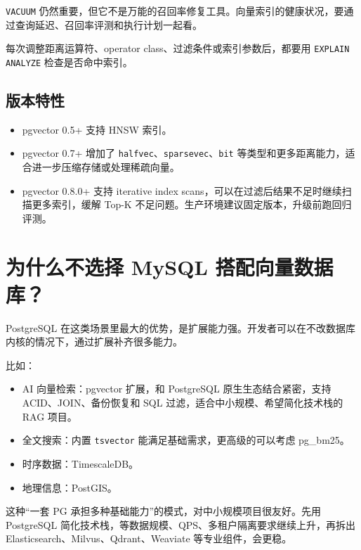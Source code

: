 \documentclass[10pt,a4paper]{ctexart}
\begin{document}
\texttt{VACUUM} 仍然重要，但它不是万能的召回率修复工具。向量索引的健康状况，要通过查询延迟、召回率评测和执行计划一起看。



每次调整距离运算符、operator class、过滤条件或索引参数后，都要用 \texttt{EXPLAIN ANALYZE} 检查是否命中索引。



\subsection{版本特性}

\begin{itemize}[itemsep=2pt, topsep=4pt]
  \item pgvector 0.5+ 支持 HNSW 索引。
  \item pgvector 0.7+ 增加了 \texttt{halfvec}、\texttt{sparsevec}、\texttt{bit} 等类型和更多距离能力，适合进一步压缩存储或处理稀疏向量。
  \item pgvector 0.8.0+ 支持 iterative index scans，可以在过滤后结果不足时继续扫描更多索引，缓解 Top-K 不足问题。生产环境建议固定版本，升级前跑回归评测。
\end{itemize}


\section{为什么不选择 MySQL 搭配向量数据库？}


PostgreSQL 在这类场景里最大的优势，是扩展能力强。开发者可以在不改数据库内核的情况下，通过扩展补齐很多能力。



比如：


\begin{itemize}[itemsep=2pt, topsep=4pt]
  \item AI 向量检索：pgvector 扩展，和 PostgreSQL 原生生态结合紧密，支持 ACID、JOIN、备份恢复和 SQL 过滤，适合中小规模、希望简化技术栈的 RAG 项目。
  \item 全文搜索：内置 \texttt{tsvector} 能满足基础需求，更高级的可以考虑 pg\_bm25。
  \item 时序数据：TimescaleDB。
  \item 地理信息：PostGIS。
\end{itemize}


这种“一套 PG 承担多种基础能力”的模式，对中小规模项目很友好。先用 PostgreSQL 简化技术栈，等数据规模、QPS、多租户隔离要求继续上升，再拆出 Elasticsearch、Milvus、Qdrant、Weaviate 等专业组件，会更稳。
\end{document}
